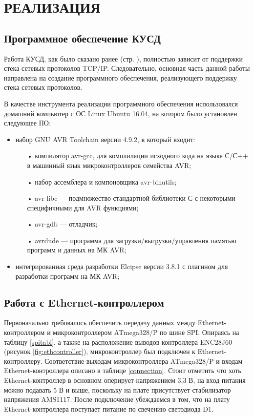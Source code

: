 \chapter{РЕАЛИЗАЦИЯ}

\section{Программное обеспечение КУСД}

Работа КУСД, как было сказано ранее (стр. \pageref{reasonofwork}), полностью зависит от поддержки стека сетевых протоколов TCP/IP. Следовательно, основная часть данной работы направлена на создание программного обеспечения, реализующего поддержку стека сетевых протоколов.

В качестве инструмента реализации программного обеспечения использовался домашний компьютер с ОС Linux Ubuntu 16.04, на котором было установлен следующее ПО:
 \begin{itemize}
	\item набор GNU AVR Toolchain версии 4.9.2, в который входит\cite{avrtoolchain}:
	\begin{itemize}
		\item[•] компилятор avr-gcc, для комплиляции исходного кода на языке С/С++ в машинный язык микроконтроллеров семейства AVR;
		\item[•] набор ассемблера и компоновщика avr-binutils;
		\item[•] avr-libc --- подмножество стандартной библиотеки С с некоторыми специфичными для AVR функциями;
		\item[•] avr-gdb --- отладчик;
		\item[•] avrdude --- программа для загрузки/выгрузки/управления памятью программ и данных на МК AVR;
	\end{itemize}
	\item интегрированная среда разработки Elcipse версии 3.8.1 с плагином для разработки программ на МК AVR;
\end{itemize}

\section{Работа с Ethernet-контроллером}

Первоначально требовалось обеспечить передачу данных между Ethernet-контроллером и микроконтроллером ATmega328/P по шине SPI. Опираясь на таблицу \ref{spitabl}, а также на расположение выводов контроллера ENC28J60 (рисунок \ref{fig:ethcontroller}), микроконтроллер был подключен к Ethernet-контроллеру. Соответствие выходам микроконтроллера ATmega328/P и входам Ethernet-контроллера описано в таблице \ref{connection}. Стоит отметить что хоть Ethernet-контроллер в основном оперирует напряжением 3,3 В, на вход питания можно подавать 5 В и выше, поскольку на плате присутствует стабилизатор напряжения AMS1117\cite{voltageregulator}. После подключение убеждаемся в том, что на плату Ethernet-контроллера поступает питание по свечению светодиода D1. 

